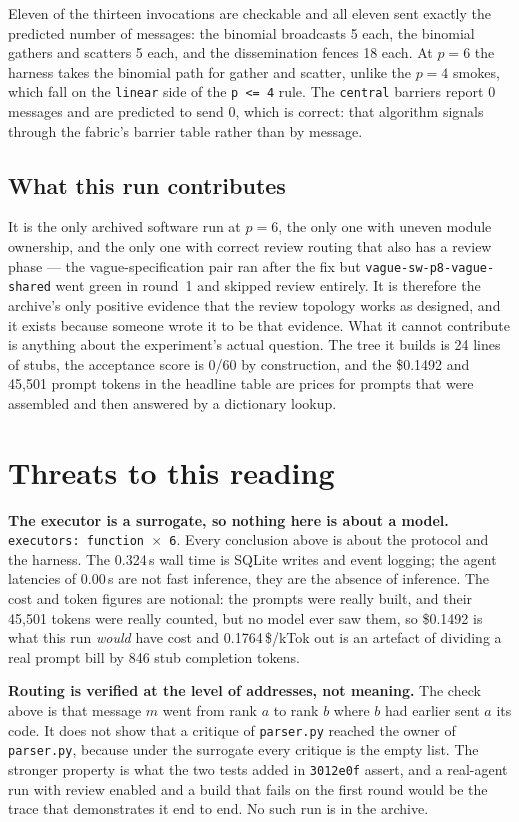 \documentclass[11pt]{article}
\begin{document}
Eleven of the thirteen invocations are checkable and all eleven sent exactly the predicted
number of messages: the binomial broadcasts 5 each, the binomial gathers and scatters 5 each,
and the dissemination fences 18 each. At $p=6$ the harness takes the binomial path for gather
and scatter, unlike the $p=4$ smokes, which fall on the \texttt{linear} side of the
\texttt{p <= 4} rule. The \texttt{central} barriers report 0 messages and are predicted to send
0, which is correct: that algorithm signals through the fabric's barrier table rather than by
message.

\subsection*{What this run contributes}

It is the only archived software run at $p=6$, the only one with uneven module ownership, and
the only one with correct review routing that also has a review phase --- the vague-specification
pair ran after the fix but \texttt{vague-sw-p8-vague-shared} went green in round~1 and skipped
review entirely. It is therefore the archive's only positive evidence that the review topology
works as designed, and it exists because someone wrote it to be that evidence. What it cannot
contribute is anything about the experiment's actual question. The tree it builds is 24 lines
of stubs, the acceptance score is 0/60 by construction, and the \$0.1492 and 45{,}501 prompt
tokens in the headline table are prices for prompts that were assembled and then answered by a
dictionary lookup.

\section{Threats to this reading}

\textbf{The executor is a surrogate, so nothing here is about a model.} \texttt{executors:
function $\times$ 6}. Every conclusion above is about the protocol and the harness. The 0.324\,s
wall time is SQLite writes and event logging; the agent latencies of 0.00\,s are not fast
inference, they are the absence of inference. The cost and token figures are notional: the
prompts were really built, and their 45{,}501 tokens were really counted, but no model ever
saw them, so \$0.1492 is what this run \emph{would} have cost and 0.1764\,\$/kTok out is an
artefact of dividing a real prompt bill by 846 stub completion tokens.

\textbf{Routing is verified at the level of addresses, not meaning.} The check above is that
message $m$ went from rank $a$ to rank $b$ where $b$ had earlier sent $a$ its code. It does not
show that a critique of \texttt{parser.py} reached the owner of \texttt{parser.py}, because
under the surrogate every critique is the empty list. The stronger property is what the two
tests added in \texttt{3012e0f} assert, and a real-agent run with review enabled and a build
that fails on the first round would be the trace that demonstrates it end to end. No such run
is in the archive.
\end{document}
